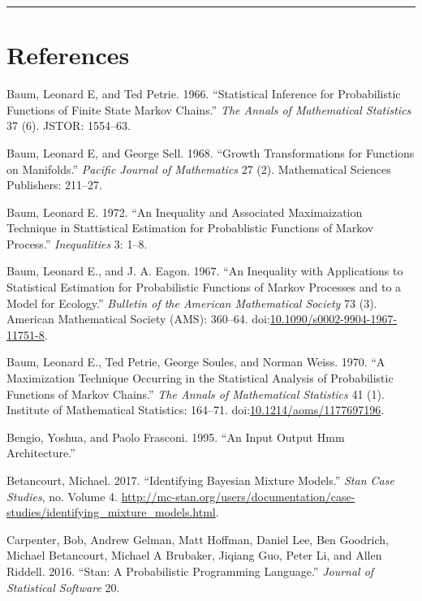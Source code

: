 \documentclass[]{article}
\begin{document}
{{{\begin{center}\rule{0.5\linewidth}{\linethickness}\end{center}

\section{References}\label{references}

\hypertarget{refs}{}
\hypertarget{ref-baum1966statistical}{}
Baum, Leonard E, and Ted Petrie. 1966. ``Statistical Inference for
Probabilistic Functions of Finite State Markov Chains.'' \emph{The
Annals of Mathematical Statistics} 37 (6). JSTOR: 1554--63.

\hypertarget{ref-baum1968growth}{}
Baum, Leonard E, and George Sell. 1968. ``Growth Transformations for
Functions on Manifolds.'' \emph{Pacific Journal of Mathematics} 27 (2).
Mathematical Sciences Publishers: 211--27.

\hypertarget{ref-baum1972inequality}{}
Baum, Leonard E. 1972. ``An Inequality and Associated Maximaization
Technique in Stattistical Estimation for Probablistic Functions of
Markov Process.'' \emph{Inequalities} 3: 1--8.

\hypertarget{ref-baum1967inequality}{}
Baum, Leonard E., and J. A. Eagon. 1967. ``An Inequality with
Applications to Statistical Estimation for Probabilistic Functions of
Markov Processes and to a Model for Ecology.'' \emph{Bulletin of the
American Mathematical Society} 73 (3). American Mathematical Society
(AMS): 360--64.
doi:\href{https://doi.org/10.1090/s0002-9904-1967-11751-8}{10.1090/s0002-9904-1967-11751-8}.

\hypertarget{ref-baum1970maximization}{}
Baum, Leonard E., Ted Petrie, George Soules, and Norman Weiss. 1970. ``A
Maximization Technique Occurring in the Statistical Analysis of
Probabilistic Functions of Markov Chains.'' \emph{The Annals of
Mathematical Statistics} 41 (1). Institute of Mathematical Statistics:
164--71.
doi:\href{https://doi.org/10.1214/aoms/1177697196}{10.1214/aoms/1177697196}.

\hypertarget{ref-bengio1995input}{}
Bengio, Yoshua, and Paolo Frasconi. 1995. ``An Input Output Hmm
Architecture.''

\hypertarget{ref-betancourt2017identifying}{}
Betancourt, Michael. 2017. ``Identifying Bayesian Mixture Models.''
\emph{Stan Case Studies}, no. Volume 4.
\url{http://mc-stan.org/users/documentation/case-studies/identifying_mixture_models.html}.

\hypertarget{ref-carpenter2016stan}{}
Carpenter, Bob, Andrew Gelman, Matt Hoffman, Daniel Lee, Ben Goodrich,
Michael Betancourt, Michael A Brubaker, Jiqiang Guo, Peter Li, and Allen
Riddell. 2016. ``Stan: A Probabilistic Programming Language.''
\emph{Journal of Statistical Software} 20.

}}}
\end{document}
